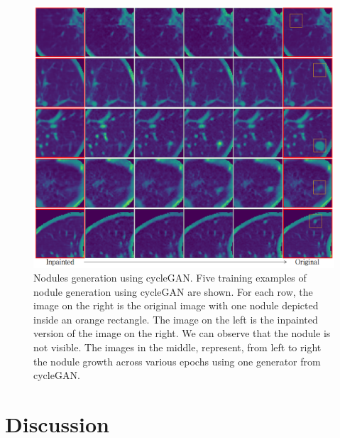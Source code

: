 \documentclass[runningheads]{llncs}
\begin{document}
\begin{figure}
\includegraphics[width=\textwidth]{cycleGAN-nodule-generator-v6.png}
\caption{Nodules generation using cycleGAN. Five training examples of nodule generation using cycleGAN are shown. For each row, the image on the right is the original image with one nodule depicted inside an orange rectangle. The image on the left is the inpainted version of the image on the right. We can observe that the nodule is not visible. The images in the middle, represent, from left to right the nodule growth across various epochs using one generator from cycleGAN.} \label{fig4}
\end{figure}

\section{Discussion}
\end{document}
